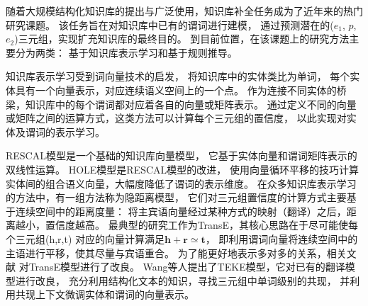 随着大规模结构化知识库的提出与广泛使用，知识库补全任务成为了近年来的热门研究课题。
该任务旨在对知识库中已有的谓词进行建模，
通过预测潜在的($e_1$, $p$, $e_2$)三元组，实现扩充知识库的最终目的。
到目前位置，在该课题上的研究方法主要分为两类：
基于知识库表示学习和基于规则推导。

知识库表示学习受到词向量技术\cite{mikolov2013exploiting,pennington2014glove}的启发，
将知识库中的实体类比为单词，
每个实体具有一个向量表示，对应连续语义空间上的一个点。
作为连接不同实体的桥梁，知识库中的每个谓词都对应着各自的向量或矩阵表示。
通过定义不同的向量或矩阵之间的运算方式，这类方法可以计算每个三元组的置信度，
以此实现对实体及谓词的表示学习。

RESCAL模型\cite{nickel2012factorizing}是一个基础的知识库向量模型，
它基于实体向量和谓词矩阵表示的双线性运算。
HOLE模型\cite{nickel2015holographic}是RESCAL模型的改进，
使用向量循环平移的技巧计算实体间的组合语义向量，大幅度降低了谓词的表示维度。
在众多知识库表示学习的方法中，有一组方法称为隐距离模型，
它们对三元组置信度的计算方式主要基于连续空间中的距离度量：
将主宾语向量经过某种方式的映射（翻译）之后，距离越小，置信度越高。
最典型的研究工作为TransE，其核心思路在于尽可能使每个三元组(h,r,t)
对应的向量计算满足$\textbf{h} + \textbf{r} \simeq \textbf{t}$，
即利用谓词向量将连续空间中的主语进行平移，使其尽量与宾语重合。
为了能更好地表示多对多的关系，相关文献\parencite{wang2014knowledge,lin2015learning}   %
对TransE模型进行了改良。
Wang等人提出了TEKE模型\cite{wang2016text}，它对已有的翻译模型进行改良，
充分利用结构化文本的知识，寻找三元组中单词级别的共现，
并利用共现上下文微调实体和谓词的向量表示。


